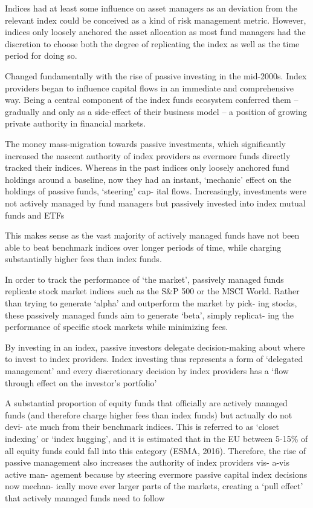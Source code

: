 \documentclass[
]{book}
\begin{document}
Indices had at least some influence on asset managers as an
deviation from the relevant index could be conceived as a kind of risk management
metric.
However, indices only loosely anchored the asset allocation as most fund
managers had the discretion to choose both the degree of replicating the index as
well as the time period for doing so.

Changed fundamentally with the rise of passive investing in the mid-2000s.
Index providers began to influence capital flows in an immediate and comprehensive way.
Being a central
component of the index funds ecosystem conferred them -- gradually and only as a
side-effect of their business model -- a position of growing private authority in
financial markets.

The money mass-migration
towards passive investments, which significantly increased the nascent authority
of index providers as evermore funds directly tracked their indices. Whereas in
the past indices only loosely anchored fund holdings around a baseline, now they
had an instant, `mechanic' effect on the holdings of passive funds, `steering' cap-
ital flows. Increasingly, investments were not actively managed by fund managers
but passively invested into index mutual funds and ETFs

This makes sense as the vast
majority of actively managed funds have not been able to beat benchmark indices
over longer periods of time, while charging substantially higher fees than index
funds.

In order to track the performance of `the market', passively
managed funds replicate stock market indices such as the S\&P 500 or the MSCI
World. Rather than trying to generate `alpha' and outperform the market by pick-
ing stocks, these passively managed funds aim to generate `beta', simply replicat-
ing the performance of specific stock markets while minimizing fees.

By investing in an index, passive investors delegate decision-making about
where to invest to index providers. Index investing thus represents a form of
`delegated management' and every discretionary decision by index providers has a
`flow through effect on the investor's portfolio'

A substantial proportion of equity funds that officially are actively managed
funds (and therefore charge higher fees than index funds) but actually do not devi-
ate much from their benchmark indices. This is referred to as `closet indexing' or
`index hugging', and it is estimated that in the EU between 5-15\% of all equity
funds could fall into this category (ESMA, 2016). Therefore, the rise of passive
management also increases the authority of index providers vis- a-vis active man-
agement because by steering evermore passive capital index decisions now mechan-
ically move ever larger parts of the markets, creating a `pull effect' that actively
managed funds need to follow
\end{document}
